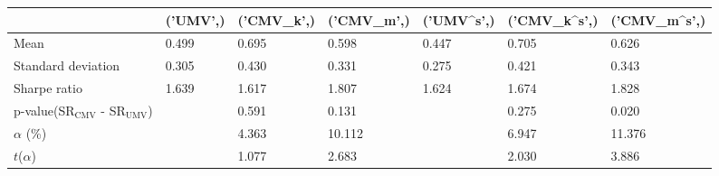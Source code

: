 \begin{tabular}{lllllll}
\toprule
 & ('UMV',) & ('CMV_k',) & ('CMV_m',) & ('UMV^s',) & ('CMV_k^s',) & ('CMV_m^s',) \\
\midrule
Mean & 0.499 & 0.695 & 0.598 & 0.447 & 0.705 & 0.626 \\
Standard deviation & 0.305 & 0.430 & 0.331 & 0.275 & 0.421 & 0.343 \\
Sharpe ratio & 1.639 & 1.617 & 1.807 & 1.624 & 1.674 & 1.828 \\
p-value(SR$_{\text{CMV}}$ - SR$_{\text{UMV}}$) &  & 0.591 & 0.131 &  & 0.275 & 0.020 \\
$\alpha$ (\%) &  & 4.363 & 10.112 &  & 6.947 & 11.376 \\
$t$($\alpha$) &  & 1.077 & 2.683 &  & 2.030 & 3.886 \\
\bottomrule
\end{tabular}
